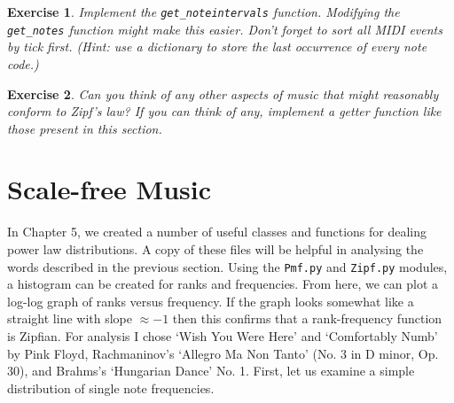 \documentclass[10pt]{book}
\newtheorem{exercise}{Exercise}[chapter]
\begin{document}
\begin{exercise}
Implement the \texttt{get\_noteintervals} function. Modifying the \texttt{get\_notes} function might make this easier. Don't forget to sort all MIDI events by tick first. (Hint: use a dictionary to store the last occurrence of every note code.)
\end{exercise}

\begin{exercise}
Can you think of any other aspects of music that might reasonably conform to Zipf's law? If you can think of any, implement a getter function like those present in this section.
\end{exercise}




\section{Scale-free Music}
\label{sec:scalefreemusic}
In Chapter 5, we created a number of useful classes and functions for dealing  power law distributions. A copy of these files will be helpful in analysing the words described in the previous section. Using the \texttt{Pmf.py} and \texttt{Zipf.py} modules, a histogram can be created for ranks and frequencies. From here, we can plot a log-log graph of ranks versus frequency. If the graph looks somewhat like a straight line with slope $\approx -1$ then this confirms that a rank-frequency function is Zipfian. For analysis I chose `Wish You Were Here' and `Comfortably Numb' by Pink Floyd, Rachmaninov's `Allegro Ma Non Tanto' (No. 3 in D minor, Op. 30), and Brahms's `Hungarian Dance' No. 1. First, let us examine a simple distribution of single note frequencies.
\end{document}
